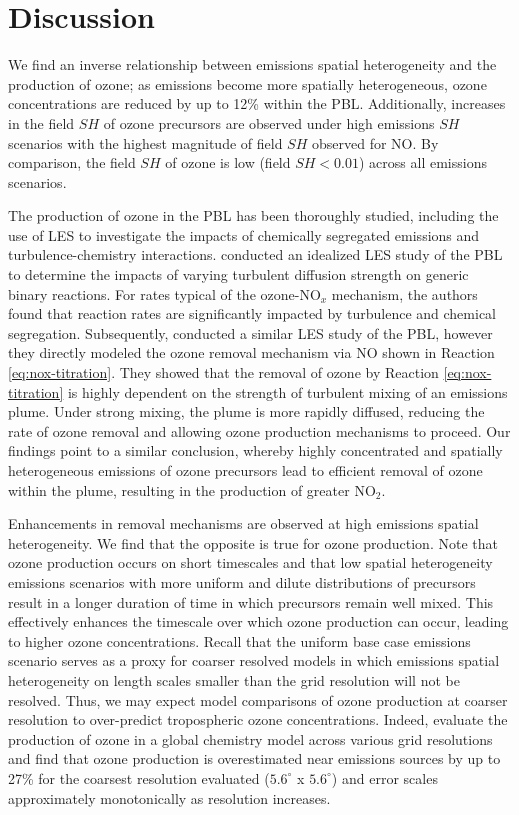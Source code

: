 \section{Discussion}

We find an inverse relationship between emissions spatial heterogeneity and the production of ozone; as emissions become more spatially heterogeneous, ozone concentrations are reduced by up to 12\% within the PBL. Additionally, increases in the field $SH$ of ozone precursors are observed under high emissions $SH$ scenarios with the highest magnitude of field $SH$ observed for NO. By comparison, the field $SH$ of ozone is low (field $SH<0.01$) across all emissions scenarios. 

The production of ozone in the PBL has been thoroughly studied, including the use of LES to investigate the impacts of chemically segregated emissions and turbulence-chemistry interactions. \cite{schumann_large-eddy_1989} conducted an idealized LES study of the PBL to determine the impacts of varying turbulent diffusion strength on generic binary reactions. For rates typical of the ozone-NO$_x$ mechanism, the authors found that reaction rates are significantly impacted by turbulence and chemical segregation. Subsequently, \cite{sykes_large-eddy_1992} conducted a similar LES study of the PBL, however they directly modeled the ozone removal mechanism via NO shown in Reaction \ref{eq:nox-titration}. They showed that the removal of ozone by Reaction \ref{eq:nox-titration} is highly dependent on the strength of turbulent mixing of an emissions plume. Under strong mixing, the plume is more rapidly diffused, reducing the rate of ozone removal and allowing ozone production mechanisms to proceed. Our findings point to a similar conclusion, whereby highly concentrated and spatially heterogeneous emissions of ozone precursors lead to efficient removal of ozone within the plume, resulting in the production of greater NO$_2$. 

Enhancements in removal mechanisms are observed at high emissions spatial heterogeneity. We find that the opposite is true for ozone production. Note that ozone production occurs on short timescales and that low spatial heterogeneity emissions scenarios with more uniform and dilute distributions of precursors result in a longer duration of time in which precursors remain well mixed. This effectively enhances the timescale over which ozone production can occur, leading to higher ozone concentrations. Recall that the uniform base case emissions scenario serves as a proxy for coarser resolved models in which emissions spatial heterogeneity on length scales smaller than the grid resolution will not be resolved. Thus, we may expect model comparisons of ozone production at coarser resolution to over-predict tropospheric ozone concentrations. Indeed, \cite{wild_global_2006} evaluate the production of ozone in a global chemistry model across various grid resolutions and find that ozone production is overestimated near emissions sources by up to 27\% for the coarsest resolution evaluated ($5.6^{\circ}$ x $5.6^{\circ}$) and error scales approximately monotonically as resolution increases. 


